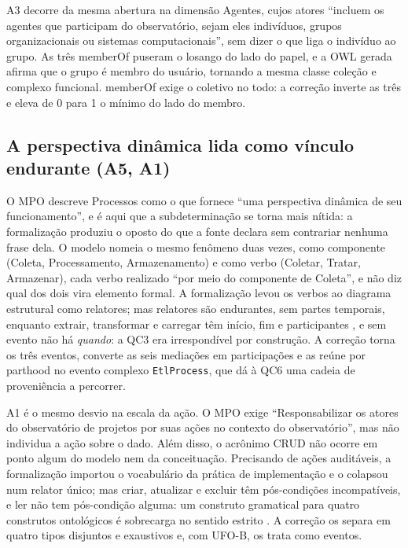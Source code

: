 A3 decorre da mesma abertura na dimensão Agentes, cujos atores ``incluem os agentes que participam do observatório, sejam eles indivíduos, grupos organizacionais ou sistemas computacionais'', sem dizer o que liga o indivíduo ao grupo. As três \guillemotleft{}memberOf\guillemotright{} puseram o losango do lado do papel, e a OWL gerada afirma que o grupo é membro do usuário, tornando a mesma classe coleção e complexo funcional. \guillemotleft{}memberOf\guillemotright{} exige o coletivo no todo: a correção inverte as três e eleva de 0 para 1 o mínimo do lado do membro.

\subsection{A perspectiva dinâmica lida como vínculo endurante (A5, A1)}

O MPO descreve Processos como o que fornece ``uma perspectiva dinâmica de seu funcionamento'', e é aqui que a subdeterminação se torna mais nítida: a formalização produziu o oposto do que a fonte declara sem contrariar nenhuma frase dela. O modelo nomeia o mesmo fenômeno duas vezes, como componente (Coleta, Processamento, Armazenamento) e como verbo (Coletar, Tratar, Armazenar), cada verbo realizado ``por meio do componente de Coleta'', e não diz qual dos dois vira elemento formal. A formalização levou os verbos ao diagrama estrutural como relatores; mas relatores são endurantes, sem partes temporais, enquanto extrair, transformar e carregar têm início, fim e participantes \cite{guizzardi2008grounding}, e sem evento não há \textit{quando}: a QC3 era irrespondível por construção. A correção torna os três eventos, converte as seis mediações em participações e as reúne por parthood no evento complexo \texttt{EtlProcess}, que dá à QC6 uma cadeia de proveniência a percorrer.

A1 é o mesmo desvio na escala da ação. O MPO exige ``Responsabilizar os atores do observatório de projetos por suas ações no contexto do observatório'', mas não individua a ação sobre o dado. Além disso, o acrônimo CRUD não ocorre em ponto algum do modelo nem da conceituação. Precisando de ações auditáveis, a formalização importou o vocabulário da prática de implementação e o colapsou num relator único; mas criar, atualizar e excluir têm pós-condições incompatíveis, e ler não tem pós-condição alguma: um construto gramatical para quatro construtos ontológicos é sobrecarga no sentido estrito \cite{wand1993ontological}. A correção os separa em quatro tipos disjuntos e exaustivos e, com UFO-B, os trata como eventos.

